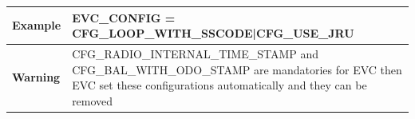 \documentclass{template/openetcs}
\begin{document}
\begin{itemize}
\begin{longtable}{|l|l|}
				\hline
				
					\begin{minipage}[t]{0.22\linewidth} \textbf{Example}	\end{minipage} 
				&	\begin{minipage}[t]{0.78\linewidth} EVC\_CONFIG = CFG\_LOOP\_WITH\_SSCODE|CFG\_USE\_JRU \end{minipage} \\
				
				\hline
			
					\begin{minipage}[t]{0.22\linewidth} \textbf{Warning}	\end{minipage} 
				&	\begin{minipage}[t]{0.78\linewidth} CFG\_RADIO\_INTERNAL\_TIME\_STAMP and CFG\_BAL\_WITH\_ODO\_STAMP are mandatories for EVC then EVC set these configurations automatically and they can be removed\end{minipage} \\
				
				\hline
				
			\end{longtable}
	\end{itemize}
	
\end{document}
